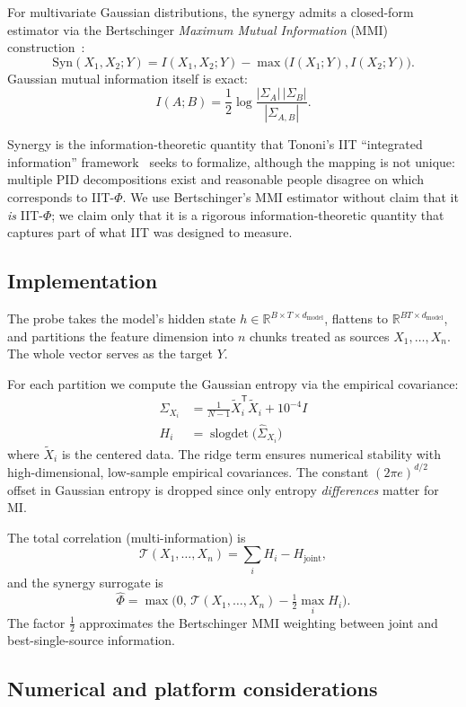 \documentclass[11pt]{article}
\newcommand{\R}{\mathbb{R}}
\newcommand{\T}{\mathsf{T}}
\DeclareMathOperator{\slogdet}{slogdet}
\begin{document}
For multivariate Gaussian distributions, the synergy admits a closed-form
estimator via the Bertschinger \emph{Maximum Mutual Information} (MMI)
construction~\citep{bertschinger2014quantifying}:
\[
\mathrm{Syn}(X_1, X_2; Y) = I(X_1, X_2; Y) - \max\big(I(X_1; Y), I(X_2; Y)\big).
\]
Gaussian mutual information itself is exact:
\[
I(A; B) = \frac{1}{2} \log \frac{|\Sigma_A| \, |\Sigma_B|}{|\Sigma_{A,B}|}.
\]

Synergy is the information-theoretic quantity that Tononi's IIT
``integrated information'' framework~\citep{tononi2004information} seeks
to formalize, although the mapping is not unique: multiple PID
decompositions exist and reasonable people disagree on which corresponds
to IIT-$\Phi$. We use Bertschinger's MMI estimator without claim that it
\emph{is} IIT-$\Phi$; we claim only that it is a rigorous information-theoretic
quantity that captures part of what IIT was designed to measure.

\subsection{Implementation}

The probe takes the model's hidden state $h \in \R^{B \times T \times
d_{\text{model}}}$, flattens to $\R^{BT \times d_{\text{model}}}$, and
partitions the feature dimension into $n$ chunks treated as sources $X_1,
\ldots, X_n$. The whole vector serves as the target $Y$.

For each partition we compute the Gaussian entropy via the empirical
covariance:
\begin{align}
\hat{\Sigma}_{X_i} &= \frac{1}{N-1} \tilde{X}_i^\T \tilde{X}_i + 10^{-4} I \\
H_i &= \slogdet \big(\hat{\Sigma}_{X_i} \big)
\end{align}
where $\tilde{X}_i$ is the centered data. The ridge term ensures
numerical stability with high-dimensional, low-sample empirical
covariances. The constant $(2\pi e)^{d/2}$ offset in Gaussian entropy is
dropped since only entropy \emph{differences} matter for MI.

The total correlation (multi-information) is
\[
\mathcal{T}(X_1, \ldots, X_n) = \sum_i H_i - H_{\text{joint}},
\]
and the synergy surrogate is
\[
\hat{\Phi} = \max\Big(0, \, \mathcal{T}(X_1, \ldots, X_n) - \tfrac{1}{2} \max_i H_i \Big).
\]
The factor $\tfrac{1}{2}$ approximates the Bertschinger MMI weighting
between joint and best-single-source information.

\subsection{Numerical and platform considerations}
\end{document}
